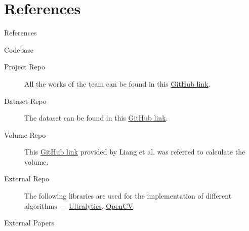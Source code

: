 \documentclass{beamer}
\begin{document}
	\section{References}
	\begin{frame}{References}
		\begin{block}{Codebase}\scriptsize
			\begin{description}
				\item [Project Repo] All the works of the team can be found in this \textcolor{red}{ \href{https://github.com/soumenkm/CS725-FML-Project}{GitHub link}}.
				\item [Dataset Repo] The dataset can be found in this \textcolor{red}{ \href{https://github.com/Liang-yc/ECUSTFD-resized-}{GitHub link}}.
				\item [Volume Repo] This \textcolor{red}{ \href{https://github.com/Liang-yc/CalorieEstimation/blob/master/faster_rcnn-master/grabcut_mex.cpp}{GitHub link}} provided by Liang et al.\cite{liang} was referred to calculate the volume.
				\item [External Repo] The following libraries are used for the implementation of different algorithms --- \textcolor{red} { \href{https://docs.ultralytics.com/modes/train/}{Ultralytics}, \href{https://docs.opencv.org/3.4/d8/d83/tutorial_py_grabcut.html}{OpenCV}}
			\end{description}
		\end{block}
		\begin{block}{External Papers}\scriptsize
			\printbibliography
		\end{block}
	\end{frame}
\end{document}
